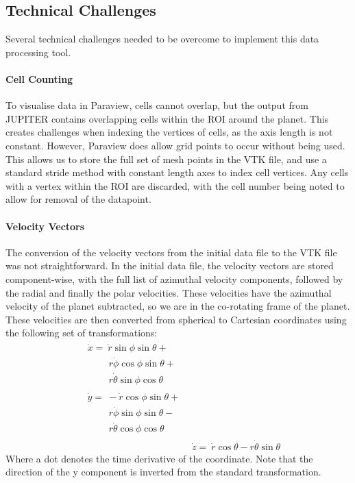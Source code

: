 \documentclass[preprint2]{aastex62}
\begin{document}
\subsection{Technical Challenges}
Several technical challenges needed to be overcome to implement this data processing tool.
\paragraph{Cell Counting}
To visualise data in Paraview, cells cannot overlap, but the output from JUPITER contains overlapping cells within the ROI around the planet. 
This creates challenges when indexing the vertices of cells, as the axis length is not constant.
However, Paraview does allow grid points to occur without being used. 
This allows us to store the full set of mesh points in the VTK file, and use a standard stride method with constant length axes to index cell vertices.
Any cells with a vertex within the ROI are discarded, with the cell number being noted to allow for removal of the datapoint.

\paragraph{Velocity Vectors}
The conversion of the velocity vectors from the initial data file to the VTK file was not straightforward. 
In the initial data file, the velocity vectors are stored component-wise, with the full list of azimuthal velocity components, followed by the radial and finally the polar velocities.
These velocities have the azimuthal velocity of the planet subtracted, so we are in the co-rotating frame of the planet.
These velocities are then converted from spherical to Cartesian coordinates using the following set of transformations:
\begin{align}
\begin{split}
&\dot{x} =\ \dot{r}\sin{\phi}\sin{\theta} +\\&\qquad\: r\dot{\phi}\cos{\phi}\sin{\theta} +\\&\qquad\: r\dot{\theta}\sin{\phi}\cos{\theta}
\end{split}\\
\begin{split}
&\dot{y} =\ -\dot{r}\cos{\phi}\sin{\theta} +\\&\qquad\: r\dot{\phi}\sin{\phi}\sin{\theta} -\\&\qquad\: r\dot{\theta}\cos{\phi}\cos{\theta}
\end{split}\\
&\dot{z} =\ \dot{r}\cos{\theta} - r\dot{\theta}\sin{\theta}
\end{align}
Where a dot denotes the time derivative of the coordinate.
Note that the direction of the y component is inverted from the standard transformation.
\end{document}
